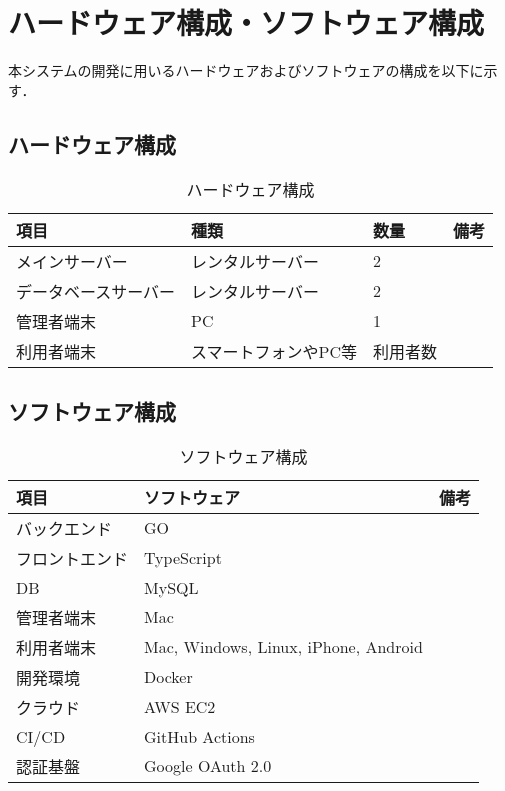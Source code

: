 \section{ハードウェア構成・ソフトウェア構成}
本システムの開発に用いるハードウェアおよびソフトウェアの構成を以下に示す．
\subsection{ハードウェア構成}
\begin{table}[H]
    \centering
    \caption{ハードウェア構成}
    \label{tab:hardware}
    \begin{tabular}{llll}
    \hline
    項目         & 種類          & 数量   & 備考 \\ \hline
    メインサーバー    & レンタルサーバー    & 2    &    \\
    データベースサーバー & レンタルサーバー    & 2    &    \\
    管理者端末      & PC          & 1    &    \\
    利用者端末      & スマートフォンやPC等 & 利用者数 &    \\ \hline
    \end{tabular}
\end{table}

\subsection{ソフトウェア構成}
\begin{table}[H]
    \centering
    \caption{ソフトウェア構成}
    \label{tab:software}
    \begin{tabular}{lll}
    \hline
    項目      & ソフトウェア                               & 備考 \\ \hline
    バックエンド  & GO                                   &    \\
    フロントエンド & TypeScript                           &    \\
    DB      & MySQL                                &    \\
    管理者端末   & Mac                  &    \\
    利用者端末   & Mac, Windows, Linux, iPhone, Android &    \\
    開発環境    & Docker                               &    \\
    クラウド    & AWS EC2                              &    \\
    CI/CD   & GitHub Actions                       &    \\
    認証基盤    & Google OAuth 2.0                     &    \\ \hline
    \end{tabular}
\end{table}